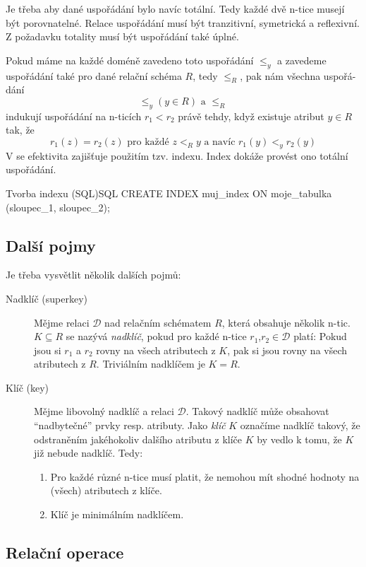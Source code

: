 Je třeba aby dané uspořádání bylo navíc totální. Tedy každé dvě n-tice musejí být porovnatelné. Relace uspořádání musí být tranzitivní, symetrická a reflexivní. Z požadavku totality musí být uspořádání také úplné.

Pokud máme na každé doméně zavedeno toto uspořádání $\leq _{y}$ a zavedeme uspořádání také pro dané relační schéma $R$, tedy $\leq _{R}$, pak nám všechna uspořá-dání
$$
\leq_{y}(y \in R) \text{ a } \leq_{R}
$$
indukují uspořádání na n-ticích $r_{1} < r_{2}$ právě tehdy, když existuje atribut $y \in R$ tak, že
$$
r_{1}(z) = r_{2}(z) \text{ pro každé } z <_{R} y \text{ a navíc } r_{1}(y) <_{y} r_{2}(y)
$$
V  se efektivita zajišťuje použitím tzv. indexu. Index dokáže provést ono totální uspořádání.
\begin{upcode}{Tvorba indexu (SQL)}{}{SQL}
CREATE INDEX muj_index ON moje_tabulka (sloupec_1, sloupec_2);
\end{upcode}

\subsection{Další pojmy}
Je třeba vysvětlit několik dalších pojmů:
\begin{description}
\item[Nadklíč (superkey)] Mějme relaci $\mathcal{D}$ nad relačním schématem $R$, která obsahuje několik n-tic. $K \subseteq R$ se nazývá \textit{nadklíč}, pokud pro každé n-tice $r_{1}$,$r_{2} \in \mathcal{D}$ platí: Pokud jsou si $r_{1}$ a $r_{2}$ rovny na všech atributech z $K$, pak si jsou rovny na všech atributech z $R$. Triviálním nadklíčem je $K=R$.
\item[Klíč (key)] Mějme libovolný nadklíč a relaci $\mathcal{D}$. Takový nadklíč může obsahovat \enquote{nadbytečné} prvky resp. atributy. Jako \textit{klíč} $K$ označíme nadklíč takový, že odstraněním jakéhokoliv dalšího atributu z klíče $K$ by vedlo k tomu, že $K$ již nebude nadklíč. Tedy:
\begin{enumerate}
\item Pro každé různé n-tice musí platit, že nemohou mít shodné hodnoty na (všech) atributech z klíče.
\item Klíč je minimálním nadklíčem.
\end{enumerate}
\end{description}

\subsection{Relační operace}
